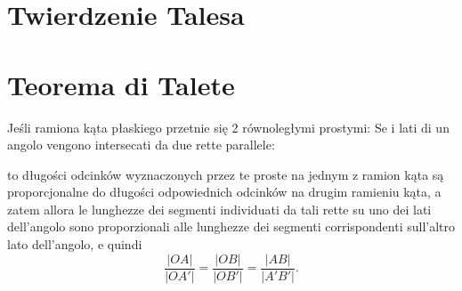 
%

\section{Twierdzenie Talesa} %
\section{Teorema di Talete} %


\begin{theorem}
[Talesa] %
[di Talete] %
    Jeśli ramiona kąta płaskiego przetnie się 2 równoległymi prostymi: %
    Se i lati di un angolo vengono intersecati da due rette parallele: %
    \begin{center}

        \end{center}
    to długości odcinków wyznaczonych przez te proste na jednym z ramion kąta są proporcjonalne do długości odpowiednich odcinków na drugim ramieniu kąta, a zatem %
    allora le lunghezze dei segmenti individuati da tali rette su uno dei lati dell'angolo sono proporzionali alle lunghezze dei segmenti corrispondenti sull'altro lato dell'angolo, e quindi %
    \begin{equation}
        \label{thales_ratio}
        \frac{|OA|}{|OA'|} = \frac{|OB|}{|OB'|} = \frac{|AB|}{|A'B'|}.
    \end{equation}
\end{theorem}

